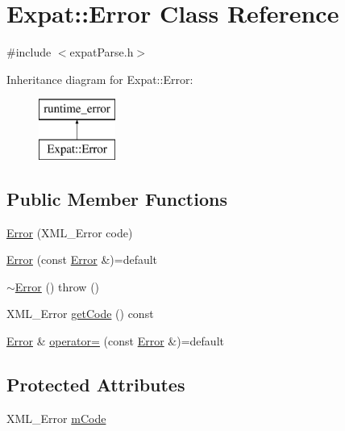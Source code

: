 \hypertarget{class_expat_1_1_error}{}\section{Expat\+:\+:Error Class Reference}
\label{class_expat_1_1_error}


{\ttfamily \#include $<$expat\+Parse.\+h$>$}

Inheritance diagram for Expat\+:\+:Error\+:\begin{figure}[H]
\begin{center}
\leavevmode
\includegraphics[height=2.000000cm]{class_expat_1_1_error}
\end{center}
\end{figure}
\subsection*{Public Member Functions}
\begin{DoxyCompactItemize}
\item 
\hyperlink{class_expat_1_1_error_acd92f134209cff2484b670af3be415ba}{Error} (X\+M\+L\+\_\+\+Error code)
\item 
\hyperlink{class_expat_1_1_error_a70a379a6a692a1f70929704cd43cb4cf}{Error} (const \hyperlink{class_expat_1_1_error}{Error} \&)=default
\item 
\hyperlink{class_expat_1_1_error_a194760fc6775aaadb65df818e7655330}{$\sim$\+Error} ()  throw ()
\item 
X\+M\+L\+\_\+\+Error \hyperlink{class_expat_1_1_error_a9a0d1a9ca664b60284c481ba094dac1e}{get\+Code} () const
\item 
\hyperlink{class_expat_1_1_error}{Error} \& \hyperlink{class_expat_1_1_error_ace2f59b903c510d0ac58613f3a2c6e4a}{operator=} (const \hyperlink{class_expat_1_1_error}{Error} \&)=default
\end{DoxyCompactItemize}
\subsection*{Protected Attributes}
\begin{DoxyCompactItemize}
\item 
X\+M\+L\+\_\+\+Error \hyperlink{class_expat_1_1_error_a6536d64df7df917a68f5984aaf2108a1}{m\+Code}
\end{DoxyCompactItemize}


